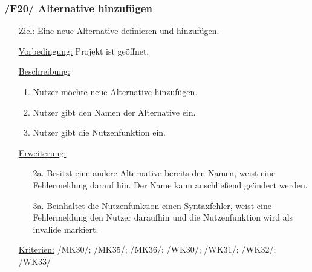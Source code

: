 \documentclass{article}
\begin{document}
\subsubsection*{\textbf{/F20/} Alternative hinzufügen} \label{sec:f:Alternative hinzufügen}
\begin{itemize}
    \item[\underline{Ziel:}] Eine neue Alternative definieren und hinzufügen.
    \item[\underline{Vorbedingung:}] Projekt ist geöffnet.
    \item[\underline{Beschreibung:}]
    \begin{enumerate}
        \item Nutzer möchte neue Alternative hinzufügen.
        \item Nutzer gibt den Namen der Alternative ein.
        \item Nutzer gibt die Nutzenfunktion ein.
    \end{enumerate}
    \item[\underline{Erweiterung:}]
    \begin{itemize}
        \item[2a.] Besitzt eine andere Alternative bereits den Namen, weist eine Fehlermeldung darauf hin. Der Name kann anschließend geändert werden.
        \item[3a.] Beinhaltet die Nutzenfunktion einen Syntaxfehler, weist eine Fehlermeldung den Nutzer daraufhin und die Nutzenfunktion wird als invalide markiert. 
    \end{itemize}
    \item[\underline{Kriterien:}] /MK30/; /MK35/; /MK36/; /WK30/; /WK31/; /WK32/; /WK33/
\end{itemize}
\end{document}
